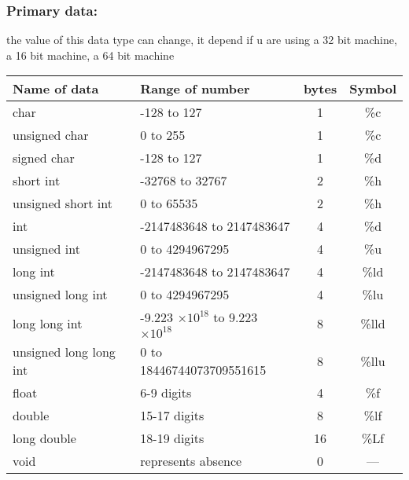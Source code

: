             \subsubsection{Primary data:}
            the value of this data type can change, it depend if u are using a 32 bit machine, a 16 bit machine, a 64 bit machine
            \renewcommand{\arraystretch}{1.5} %
            \begin{center}
                \begin{tabular}{| l | l | c | c |}
                    \hline
                    \textbf{Name of data} & \textbf{Range of number} & \textbf{bytes} & \textbf{Symbol} \\
                    \hline
                    \hline
                    char & -128 to 127 & 1 & \%c \\
                    unsigned char & 0 to 255 & 1 & \%c \\
                    signed char & -128 to 127 & 1 & \%d \\
                    \hline
                    short int & -32768 to 32767 & 2 & \%h \\
                    unsigned short int & 0 to 65535 & 2 & \%h \\
                    int & -2147483648 to 2147483647 & 4 & \%d \\
                    unsigned int & 0 to 4294967295 & 4 & \%u \\
                    long int & -2147483648 to 2147483647 & 4 & \%ld \\
                    unsigned long int & 0 to 4294967295 & 4 & \%lu \\
                    long long int & -9.223 $\times 10^{18}$ to 9.223 $\times 10^{18}$ & 8 & \%lld \\
                    unsigned long long int & 0 to 18446744073709551615 & 8 & \%llu \\
                    \hline
                    float & 6-9 digits & 4 & \%f \\
                    double & 15-17 digits & 8 & \%lf \\
                    long double & 18-19 digits & 16 & \%Lf \\
                    \hline
                    void & represents absence & 0 & --- \\
                    \hline
                \end{tabular}
            \end{center}

